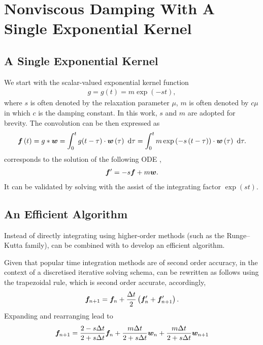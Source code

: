 \section{Nonviscous Damping With A Single Exponential Kernel}
\subsection{A Single Exponential Kernel}
We start with the scalar-valued exponential kernel function
\begin{gather}
g=g\left(t\right)=m\exp\left(-st\right),
\end{gather}
where $s$ is often denoted by the relaxation parameter $\mu$, $m$ is often denoted by $c\mu$ in which $c$ is the damping constant. In this work, $s$ and $m$ are adopted for brevity.
The convolution can be then expressed as
\begin{gather}\label{eq:single_conv}
\bm{f}\left(t\right)=g*\bm{w}=\int_0^tg(t-\tau)\cdot\bm{w}\left(\tau\right)~\mathrm{d}\tau=\int_0^tm\exp\left(-s\left(t-\tau\right)\right)\cdot\bm{w}\left(\tau\right)~\mathrm{d}\tau.
\end{gather}
 corresponds to the solution of the following ODE \citep[see, e.g.,][\S~80]{Zwillinger2021},
\begin{gather}\label{eq:single_conv_ode}
\bm{f}'=-s\bm{f}+m\bm{w}.
\end{gather}
It can be validated by solving  with the assist of the integrating factor $\exp\left(st\right)$.
\subsection{An Efficient Algorithm}
Instead of directly integrating  using higher-order methods (such as the Runge--Kutta family),  can be combined with  to develop an efficient algorithm.

Given that popular time integration methods are of second order accuracy, in the context of a discretised iterative solving schema,  can be rewritten as follows using the trapezoidal rule, which is second order accurate, accordingly,
\begin{gather}
\bm{f}_{n+1}=\bm{f}_n+\dfrac{\Delta{}t}{2}\left(\bm{f}_n'+\bm{f}_{n+1}'\right).
\end{gather}
Expanding and rearranging lead to
\begin{gather}
\bm{f}_{n+1}=\dfrac{2-s\Delta{}t}{2+s\Delta{}t}\bm{f}_n+\dfrac{m\Delta{}t}{2+s\Delta{}t}\bm{w}_n+\dfrac{m\Delta{}t}{2+s\Delta{}t}\bm{w}_{n+1}
\end{gather}

